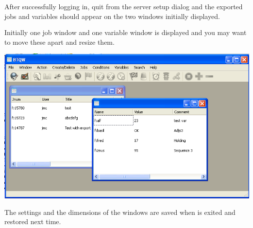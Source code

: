 After successfully logging in, quit from the server setup dialog and the exported jobs and variables should appear on the two windows initially
displayed.

Initially one job window and one variable window is displayed and you may want to move these apart and resize them.

\includegraphics{img/btqwjwfirst.png}

The settings and the dimensions of the windows are saved when  is exited and restored next time.


